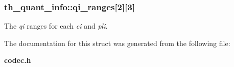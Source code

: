 \subsubsection[{qi\_\-ranges}]{ {\bf th\_\-quant\_\-info::qi\_\-ranges}[2][3]}\label{structth__quant__info_a6feacf4b365e305a7df7b93d87ee7bb8}


The {\itshape qi\/} ranges for each {\itshape ci\/} and {\itshape pli\/}. 



The documentation for this struct was generated from the following file:\begin{DoxyCompactItemize}
\item 
{\bf codec.h}\end{DoxyCompactItemize}
